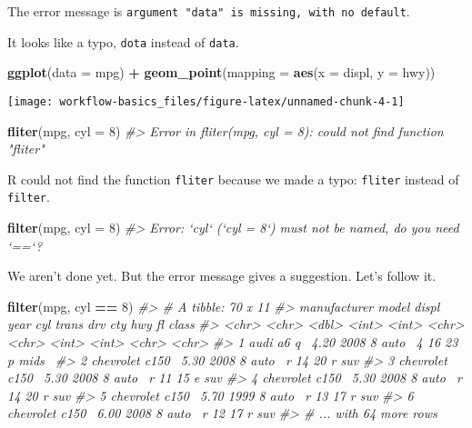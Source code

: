 \documentclass[]{book}
\newenvironment{Shaded}{\begin{snugshade}}{\end{snugshade}}
\newcommand{\CommentTok}[1]{\textcolor[rgb]{0.56,0.35,0.01}{\textit{#1}}}
\newcommand{\DataTypeTok}[1]{\textcolor[rgb]{0.13,0.29,0.53}{#1}}
\newcommand{\DecValTok}[1]{\textcolor[rgb]{0.00,0.00,0.81}{#1}}
\newcommand{\KeywordTok}[1]{\textcolor[rgb]{0.13,0.29,0.53}{\textbf{#1}}}
\newcommand{\NormalTok}[1]{#1}
\newcommand{\OperatorTok}[1]{\textcolor[rgb]{0.81,0.36,0.00}{\textbf{#1}}}
\newcommand{\StringTok}[1]{\textcolor[rgb]{0.31,0.60,0.02}{#1}}
\theoremstyle{definition}
\theoremstyle{definition}
\theoremstyle{definition}
\theoremstyle{remark}
\begin{document}
The error message is
\texttt{argument\ "data"\ is\ missing,\ with\ no\ default}.

It looks like a typo, \texttt{dota} instead of \texttt{data}.

\begin{Shaded}
\begin{Highlighting}[]
\KeywordTok{ggplot}\NormalTok{(}\DataTypeTok{data =}\NormalTok{ mpg) }\OperatorTok{+}\StringTok{ }
\StringTok{  }\KeywordTok{geom_point}\NormalTok{(}\DataTypeTok{mapping =} \KeywordTok{aes}\NormalTok{(}\DataTypeTok{x =}\NormalTok{ displ, }\DataTypeTok{y =}\NormalTok{ hwy))}
\end{Highlighting}
\end{Shaded}

\begin{center}\texttt{[image: workflow-basics\_files/figure-latex/unnamed-chunk-4-1]} \end{center}

\begin{Shaded}
\begin{Highlighting}[]
\KeywordTok{fliter}\NormalTok{(mpg, }\DataTypeTok{cyl =} \DecValTok{8}\NormalTok{)}
\CommentTok{#> Error in fliter(mpg, cyl = 8): could not find function "fliter"}
\end{Highlighting}
\end{Shaded}

R could not find the function \texttt{fliter} because we made a typo:
\texttt{fliter} instead of \texttt{filter}.

\begin{Shaded}
\begin{Highlighting}[]
\KeywordTok{filter}\NormalTok{(mpg, }\DataTypeTok{cyl =} \DecValTok{8}\NormalTok{)}
\CommentTok{#> Error: `cyl` (`cyl = 8`) must not be named, do you need `==`?}
\end{Highlighting}
\end{Shaded}

We aren't done yet. But the error message gives a suggestion. Let's
follow it.

\begin{Shaded}
\begin{Highlighting}[]
\KeywordTok{filter}\NormalTok{(mpg, cyl }\OperatorTok{==}\StringTok{ }\DecValTok{8}\NormalTok{)}
\CommentTok{#> # A tibble: 70 x 11}
\CommentTok{#>   manufacturer model displ  year   cyl trans drv     cty   hwy fl    class}
\CommentTok{#>   <chr>        <chr> <dbl> <int> <int> <chr> <chr> <int> <int> <chr> <chr>}
\CommentTok{#> 1 audi         a6 q~  4.20  2008     8 auto~ 4        16    23 p     mids~}
\CommentTok{#> 2 chevrolet    c150~  5.30  2008     8 auto~ r        14    20 r     suv  }
\CommentTok{#> 3 chevrolet    c150~  5.30  2008     8 auto~ r        11    15 e     suv  }
\CommentTok{#> 4 chevrolet    c150~  5.30  2008     8 auto~ r        14    20 r     suv  }
\CommentTok{#> 5 chevrolet    c150~  5.70  1999     8 auto~ r        13    17 r     suv  }
\CommentTok{#> 6 chevrolet    c150~  6.00  2008     8 auto~ r        12    17 r     suv  }
\CommentTok{#> # ... with 64 more rows}
\end{Highlighting}
\end{Shaded}
\end{document}
